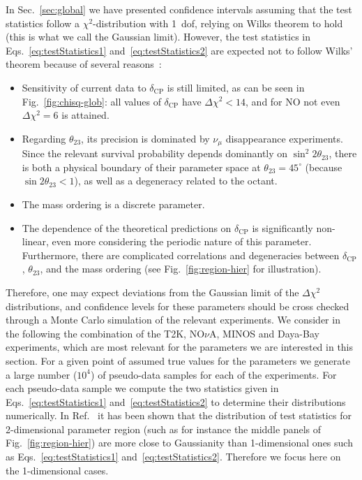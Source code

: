 \documentclass[a4paper, 11pt]{article}
\begin{document}
In Sec.~\ref{sec:global} we have presented confidence intervals
assuming that the test statistics follow a $\chi^2$-distribution with
1~dof, relying on Wilks theorem to hold~\cite{Wilks:1938dza} (this is
what we call the Gaussian limit). However, the test statistics in
Eqs.~\eqref{eq:testStatistics1} and~\eqref{eq:testStatistics2} are
expected not to follow Wilks' theorem because of several
reasons~\cite{Elevant:2015ska}:
%
\begin{itemize}
\item Sensitivity of current data to $\delta_\text{CP}$ is still
  limited, as can be seen in Fig.~\ref{fig:chisq-glob}: all values of
  $\delta_\text{CP}$ have $\Delta \chi^2 < 14$, and for NO not even
  $\Delta \chi^2 = 6$ is attained.

\item Regarding $\theta_{23}$, its precision is dominated by $\nu_\mu$
  disappearance experiments. Since the relevant survival probability
  depends dominantly on $\sin^2 2\theta_{23}$, there is both a
  physical boundary of their parameter space at $\theta_{23} =
  45^\circ$ (because $\sin 2\theta_{23}<1$), as well as a degeneracy
  related to the octant.

\item The mass ordering is a discrete parameter.

\item The dependence of the theoretical predictions on
  $\delta_\text{CP}$ is significantly non-linear, even more
  considering the periodic nature of this parameter. Furthermore,
  there are complicated correlations and degeneracies between
  $\delta_\text{CP}$, $\theta_{23}$, and the mass ordering (see
  Fig.~\ref{fig:region-hier} for illustration).
\end{itemize}
%
Therefore, one may expect deviations from the Gaussian limit of the
$\Delta\chi^2$ distributions, and confidence levels for these
parameters should be cross checked through a Monte Carlo simulation of
the relevant experiments. We consider in the following the combination
of the T2K, NO$\nu$A, MINOS and Daya-Bay experiments, which are most
relevant for the parameters we are interested in this section. For a
given point of assumed true values for the parameters we generate a
large number ($10^4$) of pseudo-data samples for each of the
experiments. For each pseudo-data sample we compute the two statistics
given in Eqs.~\eqref{eq:testStatistics1}
and~\eqref{eq:testStatistics2} to determine their distributions
numerically. In Ref.~\cite{Elevant:2015ska} it has been shown that the
distribution of test statistics for 2-dimensional parameter region
(such as for instance the middle panels of Fig.~\ref{fig:region-hier})
are more close to Gaussianity than 1-dimensional ones such as
Eqs.~\eqref{eq:testStatistics1}
and~\eqref{eq:testStatistics2}. Therefore we focus here on the
1-dimensional cases.
\end{document}
